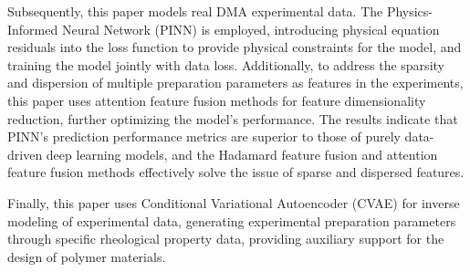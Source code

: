 Subsequently, this paper models real DMA experimental data. The Physics-Informed Neural Network (PINN) is employed, introducing physical equation residuals into the loss function to provide physical constraints for the model, and training the model jointly with data loss. Additionally, to address the sparsity and dispersion of multiple preparation parameters as features in the experiments, this paper uses attention feature fusion methods for feature dimensionality reduction, further optimizing the model's performance. The results indicate that PINN's prediction performance metrics are superior to those of purely data-driven deep learning models, and the Hadamard feature fusion and attention feature fusion methods effectively solve the issue of sparse and dispersed features.

Finally, this paper uses Conditional Variational Autoencoder (CVAE) for inverse modeling of experimental data, generating experimental preparation parameters through specific rheological property data, providing auxiliary support for the design of polymer materials.
